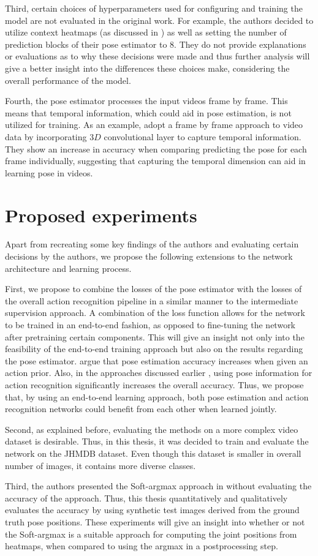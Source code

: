 Third, certain choices of hyperparameters used for configuring and training the model  are not evaluated in the original work.
For example, the authors decided to utilize context heatmaps (as discussed in ) as well as setting the number of prediction blocks of their pose estimator to $8$.
They do not provide explanations or evaluations as to why these decisions were made and thus further analysis will give a better insight into the differences these choices make, considering the overall performance of the model.

Fourth, the pose estimator processes the input videos frame by frame.
This means that temporal information, which could aid in pose estimation, is not utilized for training.
As an example, \cite{girdhar_detect-and-track:_2018} adopt a frame by frame approach to video data by incorporating $3D$ convolutional layer to capture temporal information.
They show an increase in accuracy when comparing predicting the pose for each frame individually, suggesting that capturing the temporal dimension can aid in learning pose in videos.

\section{Proposed experiments}
Apart from recreating some key findings of the authors and evaluating certain decisions by the authors, we propose the following extensions to the network architecture and learning process.

First, we propose to combine the losses of the pose estimator with the losses of the overall action recognition pipeline in a similar manner to the intermediate supervision approach.
A combination of the loss function allows for the network to be trained in an end-to-end fashion, as opposed to fine-tuning the network after pretraining certain components.
This will give an insight not only into the feasibility of the end-to-end training approach but also on the results regarding the pose estimator.
\cite{iqbal_pose_2016} argue that pose estimation accuracy increases when given an action prior.
Also, in the approaches discussed earlier , using pose information for action recognition significantly increases the overall accuracy.
Thus, we propose that, by using an end-to-end learning approach, both pose estimation and action recognition networks could benefit from each other when learned jointly.

Second, as explained before, evaluating the methods on a more complex video dataset is desirable.
Thus, in this thesis, it was decided to train and evaluate the network on the JHMDB dataset.
Even though this dataset is smaller in overall number of images, it contains more diverse classes.

Third, the authors presented the Soft-argmax approach in \cite{luvizon_human_2017} without evaluating the accuracy of the approach.
Thus, this thesis quantitatively and qualitatively evaluates the accuracy by using synthetic test images derived from the ground truth pose positions.
These experiments will give an insight into whether or not the Soft-argmax is a suitable approach for computing the joint positions from heatmaps, when compared to using the argmax in a postprocessing step.
